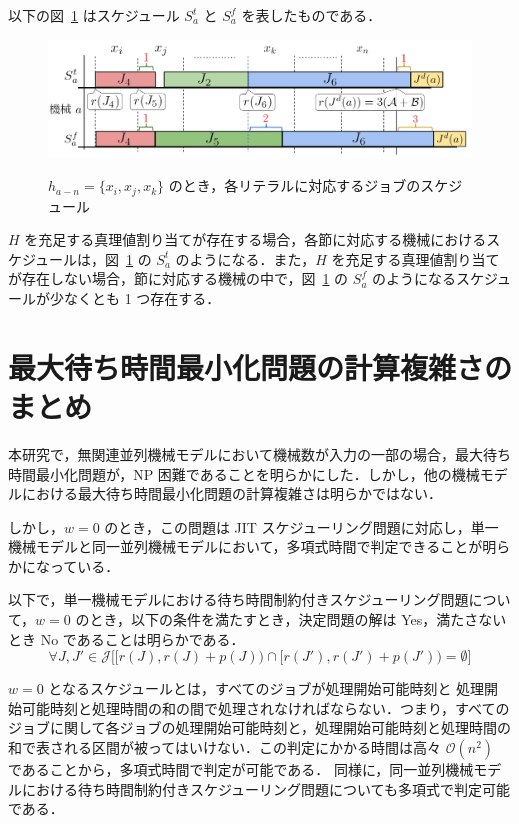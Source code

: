 \documentclass[12pt]{optlab-bachelor}
\begin{document}
以下の図~\ref{4.2} はスケジュール $S^t_a$ と $S^f_a$ を表したものである．

\begin{figure}[h]
  \centering
  \includegraphics[width = 16cm]{figure/3SAT2.pdf}\\
  \caption{$h_{a - n} = \{x_i, x_j, x_k\}$ のとき，各リテラルに対応するジョブのスケジュール}
  \label{4.2}
\end{figure}

$H$ を充足する真理値割り当てが存在する場合，各節に対応する機械におけるスケジュールは，図~\ref{4.2} の $S^t_a$ のようになる．また，$H$ を充足する真理値割り当てが存在しない場合，節に対応する機械の中で，図~\ref{4.2} の $S^f_a$ のようになるスケジュールが少なくとも 1 つ存在する．

\section{最大待ち時間最小化問題の計算複雑さのまとめ}\label{4_s_2}
本研究で，無関連並列機械モデルにおいて機械数が入力の一部の場合，最大待ち時間最小化問題が，NP 困難であることを明らかにした．しかし，他の機械モデルにおける最大待ち時間最小化問題の計算複雑さは明らかではない．

しかし，$w = 0$ のとき，この問題は JIT スケジューリング問題に対応し，単一機械モデルと同一並列機械モデルにおいて，多項式時間で判定できることが明らかになっている．

以下で，単一機械モデルにおける待ち時間制約付きスケジューリング問題について，$w = 0$ のとき，以下の条件を満たすとき，決定問題の解は Yes，満たさないとき No であることは明らかである．
\begin{displaymath}
  \forall J,J' \in \mathcal{J}\bigg[\big[r(J),r(J) + p(J)\big) \cap \big[r(J'),r(J') + p(J')\big) = \emptyset\bigg]
\end{displaymath}

$w = 0$ となるスケジュールとは，すべてのジョブが処理開始可能時刻と 処理開始可能時刻と処理時間の和の間で処理されなければならない．つまり，すべてのジョブに関して各ジョブの処理開始可能時刻と，処理開始可能時刻と処理時間の和で表される区間が被ってはいけない．この判定にかかる時間は高々 $\mathcal{O}(n^2)$ であることから，多項式時間で判定が可能である．
同様に，同一並列機械モデルにおける待ち時間制約付きスケジューリング問題についても多項式で判定可能である．
\end{document}
